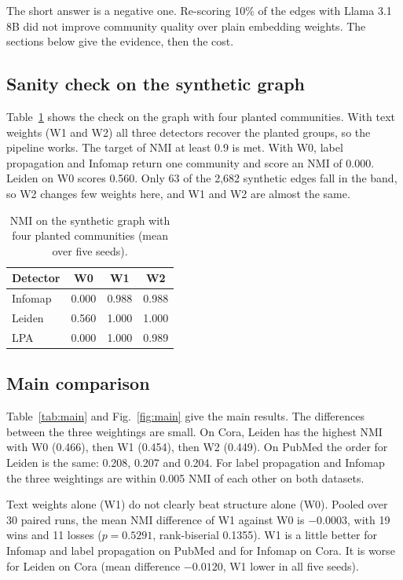 The short answer is a negative one. Re-scoring 10\% of the edges with Llama 3.1 8B did not improve community quality over plain embedding weights. The sections below give the evidence, then the cost.

\subsection{Sanity check on the synthetic graph}
Table~\ref{tab:sanity} shows the check on the graph with four planted communities. With text weights (W1 and W2) all three detectors recover the planted groups, so the pipeline works. The target of NMI at least 0.9 is met. With W0, label propagation and Infomap return one community and score an NMI of 0.000. Leiden on W0 scores 0.560. Only 63 of the 2,682 synthetic edges fall in the band, so W2 changes few weights here, and W1 and W2 are almost the same.

\begin{table}[!t]
\centering
\caption{NMI on the synthetic graph with four planted communities (mean over five seeds).}
\label{tab:sanity}
\small
\begin{tabular}{@{}lccc@{}}
\toprule
Detector & W0 & W1 & W2 \\
\midrule
Infomap & 0.000 & 0.988 & 0.988 \\
Leiden & 0.560 & 1.000 & 1.000 \\
LPA & 0.000 & 1.000 & 0.989 \\
\bottomrule
\end{tabular}
\end{table}


\subsection{Main comparison}
Table~\ref{tab:main} and Fig.~\ref{fig:main} give the main results. The differences between the three weightings are small. On Cora, Leiden has the highest NMI with W0 (0.466), then W1 (0.454), then W2 (0.449). On PubMed the order for Leiden is the same: 0.208, 0.207 and 0.204. For label propagation and Infomap the three weightings are within 0.005 NMI of each other on both datasets.

Text weights alone (W1) do not clearly beat structure alone (W0). Pooled over 30 paired runs, the mean NMI difference of W1 against W0 is $-0.0003$, with 19 wins and 11 losses ($p=0.5291$, rank-biserial 0.1355). W1 is a little better for Infomap and label propagation on PubMed and for Infomap on Cora. It is worse for Leiden on Cora (mean difference $-0.0120$, W1 lower in all five seeds).


